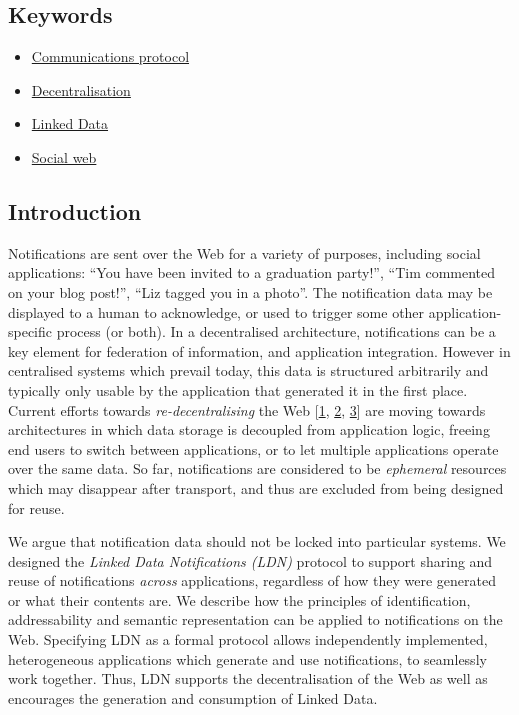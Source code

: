 \documentclass[]{article}
\providecommand{\tightlist}{%
  \setlength{\itemsep}{0pt}\setlength{\parskip}{0pt}}
\begin{document}
\hypertarget{keywords}{}
\subsection{Keywords}\label{keywords}

\begin{itemize}
\tightlist
\item
  \href{https://en.wikipedia.org/wiki/Communications_protocol}{Communications
  protocol}
\item
  \href{https://en.wikipedia.org/wiki/Decentralization}{Decentralisation}
\item
  \href{https://en.wikipedia.org/wiki/Linked_data}{Linked Data}
\item
  \href{https://en.wikipedia.org/wiki/Social_web}{Social web}
\end{itemize}

\hypertarget{introduction}{}
\subsection{Introduction}\label{introduction}

Notifications are sent over the Web for a variety of purposes, including
social applications: ``You have been invited to a graduation party!'',
``Tim commented on your blog post!'', ``Liz tagged you in a photo''. The
notification data may be displayed to a human to acknowledge, or used to
trigger some other application-specific process (or both).
\protect\hypertarget{issue}{}{In a decentralised architecture,
notifications can be a key element for federation of information, and
application integration. However in {centralised systems which prevail
today}, this data is structured arbitrarily and typically only usable by
the application that generated it in the first place. Current efforts
towards \emph{re-decentralising} the Web
{[}\protect\hyperlink{ref-1}{1}, \protect\hyperlink{ref-2}{2},
\protect\hyperlink{ref-3}{3}{]} are moving towards architectures in
which data storage is decoupled from application logic, freeing end
users to switch between applications, or to let multiple applications
operate over the same data. So far, notifications are considered to be
\emph{ephemeral} resources which may disappear after transport, and thus
are excluded from being designed for reuse.}

We argue that notification data should not be locked into particular
systems. We designed the \emph{Linked Data Notifications (LDN)} protocol
to support sharing and reuse of notifications \emph{across}
applications, regardless of how they were generated or what their
contents are. We describe how the principles of identification,
addressability and semantic representation can be applied to
notifications on the Web. Specifying LDN as a formal protocol allows
independently implemented, heterogeneous applications which generate and
use notifications, to seamlessly work together. Thus, LDN supports the
decentralisation of the Web as well as encourages the generation and
consumption of Linked Data.
\end{document}

